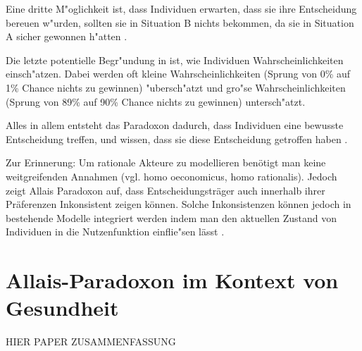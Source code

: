 \documentclass[11pt]{article}
\begin{document}
   Eine dritte M"oglichkeit ist, dass Individuen erwarten, dass sie ihre Entscheidung bereuen w"urden, sollten sie in Situation B nichts bekommen, da sie in Situation A sicher gewonnen h"atten \parencite[Bell, 1982; Loomes und Sugden, 1982; 1987a;b, in ][S. 3]{oliver2003quantitative}.
   
   Die letzte potentielle Begr"undung in \textcite[S. 4]{oliver2003quantitative} ist, wie Individuen Wahrscheinlichkeiten einsch"atzen. Dabei werden oft kleine Wahrscheinlichkeiten (Sprung von 0\% auf 1\% Chance nichts zu gewinnen) "ubersch"atzt und gro"se Wahrscheinlichkeiten (Sprung von 89\% auf 90\% Chance nichts zu gewinnen) untersch"atzt.

   Alles in allem entsteht das Paradoxon dadurch, dass Individuen eine bewusste Entscheidung treffen, und wissen, dass sie diese Entscheidung getroffen haben \parencite[S. 17]{gintis2009bounds}.

   Zur Erinnerung: Um rationale Akteure zu modellieren ben\"otigt man keine weitgreifenden Annahmen (vgl. homo oeconomicus, homo rationalis). Jedoch zeigt Allais Paradoxon auf, dass Entscheidungstr\"ager auch innerhalb ihrer Pr\"aferenzen Inkonsistent zeigen k\"onnen. Solche Inkonsistenzen k\"onnen jedoch in bestehende Modelle integriert werden indem man den aktuellen Zustand von Individuen in die Nutzenfunktion einflie"sen l\"asst \parencite[siehe Kahnemans Prospect Theory in][S. 246]{gintis2009bounds}. 
   
   
\section{Allais-Paradoxon im Kontext von Gesundheit}
\label{sec:allais-paradoxon-im}

HIER PAPER ZUSAMMENFASSUNG



\printbibliography
\end{document}
